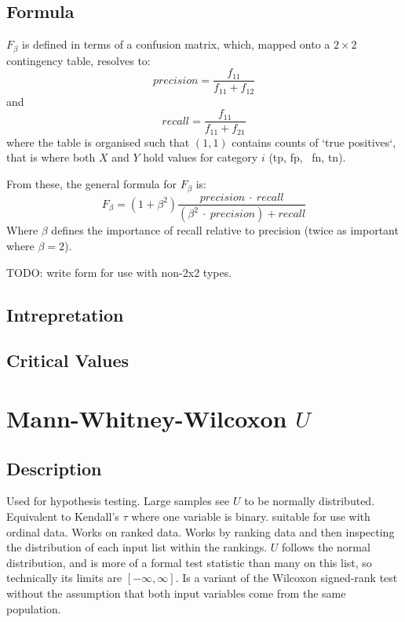 \documentclass[11pt]{article}
\begin{document}
\subsection{Formula}
$F_\beta$ is defined in terms of a confusion matrix, which, mapped onto a $2\times 2$ contingency table, resolves to:
$$
precision = \frac{ f_{11} }{ f_{11} + f_{12} }
$$
and
$$
recall = \frac{ f_{11} }{ f_{11} + f_{21} }
$$
where the table is organised such that $(1,1)$ contains counts of `true positives`, that is where both $X$ and $Y$ hold values for category $i$ (tp, fp, \ fn, tn).

From these, the general formula for $F_\beta$ is:
$$
F_\beta = (1 + \beta^2) \frac{ precision ~\cdot~ recall }{ (\beta^2 ~ \cdot ~ precision) + recall }
$$
Where $\beta$ defines the importance of recall relative to precision (twice as important where $\beta = 2$).

TODO: write form for use with non-2x2 types.

\subsection{Intrepretation}

\subsection{Critical Values}













\section{Mann-Whitney-Wilcoxon $U$}
\label{section:mannwhitney}
\subsection{Description}
Used for hypothesis testing.  
Large samples see $U$ to be normally distributed.  
Equivalent to Kendall's $\tau$ where one variable is binary.  
suitable for use with ordinal data.  
Works on ranked data.  
Works by ranking data and then inspecting the distribution of each input list within the rankings.  
$U$ follows the normal distribution, and is more of a formal test statistic than many on this list, so technically its limits are $[-\infty, \infty]$.  
Is a variant of the Wilcoxon signed-rank test without the assumption that both input variables come from the same population.
\end{document}
